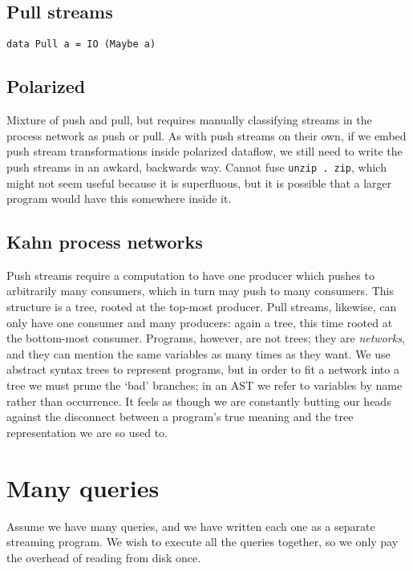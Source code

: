 \subsection{Pull streams}

\begin{lstlisting}
data Pull a = IO (Maybe a)
\end{lstlisting}

\subsection{Polarized}
Mixture of push and pull, but requires manually classifying streams in the process network as push or pull.
As with push streams on their own, if we embed push stream transformations inside polarized dataflow, we still need to write the push streams in an awkard, backwards way.
Cannot fuse \lstinline/unzip . zip/, which might not seem useful because it is superfluous, but it is possible that a larger program would have this somewhere inside it.

\subsection{Kahn process networks}

Push streams require a computation to have one producer which pushes to arbitrarily many consumers, which in turn may push to many consumers.
This structure is a tree, rooted at the top-most producer.
Pull streams, likewise, can only have one consumer and many producers: again a tree, this time rooted at the bottom-most consumer.
Programs, however, are not trees; they are \emph{networks}, and they can mention the same variables as many times as they want.
We use abstract syntax trees to represent programs, but in order to fit a network into a tree we must prune the `bad' branches; in an AST we refer to variables by name rather than occurrence.
It feels as though we are constantly butting our heads against the disconnect between a program's true meaning and the tree representation we are so used to.


\section{Many queries}

Assume we have many queries, and we have written each one as a separate streaming program.
We wish to execute all the queries together, so we only pay the overhead of reading from disk once.


